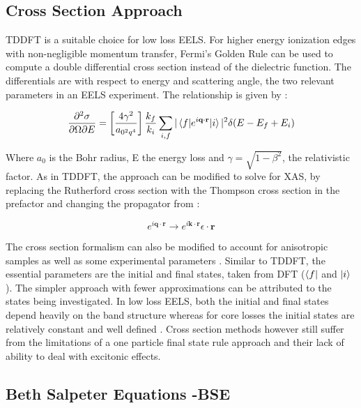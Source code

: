 
\subsection{Cross Section Approach}
TDDFT is a suitable choice for low loss EELS.  For higher energy ionization edges with non-negligible momentum transfer, Fermi's Golden Rule can be used to compute a double differential cross section instead of the dielectric function.  The differentials are with respect to energy and scattering angle, the two relevant parameters in an EELS experiment.  The relationship is given by \cite{hebert_practical_2007}:

\begin{equation}
		\frac{\partial^2 \sigma}{\partial \Omega \partial E} = \left[\frac{4\gamma^2}{a_{\mathrm{0}^2q^4}}\right] \frac{k_f}{k_i} \sum_{i,f}|\mel{f}{e^{i\textbf{q}\cdot\textbf{r}}}{i}|^2\delta(E-E_f+E_i)
		\label{telnes_eq}
\end{equation}

Where $a_0$ is the Bohr radius, E the energy loss and $\gamma = \sqrt{1- \beta^2}$, the relativistic factor.  As in TDDFT, the approach can be modified to solve for XAS, by replacing the Rutherford cross section with the Thompson cross section in the prefactor and changing the propagator from \cite{ankudinov_real-space_1998}:

\begin{equation}
	e^{i\textbf{q}\cdot\textbf{r}} \to e^{i\textbf{k}\cdot\textbf{r}}\epsilon \cdot \textbf{r}
\end{equation}

The cross section formalism can also be modified to account for anisotropic samples as well as some experimental parameters \cite{hebert_practical_2007}. Similar to TDDFT, the essential parameters are the initial and final states, taken from DFT ($\bra{f}$ and $\ket{i}$).  The simpler approach with fewer approximations can be attributed to the states being investigated.  In low loss EELS, both the initial and final states depend heavily on the band structure whereas for core losses the initial states are relatively constant and well defined \cite{hebert_practical_2007}.  Cross section methods however still suffer from the limitations of a one particle final state rule approach and their lack of ability to deal with excitonic effects.  

\subsection{Beth Salpeter Equations -BSE}

